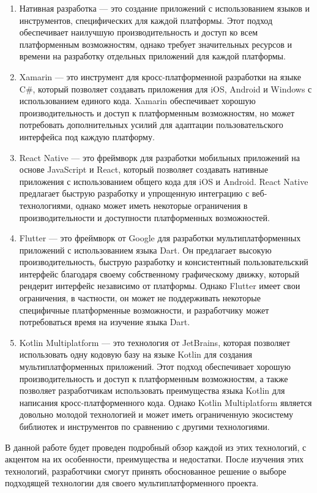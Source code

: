 \documentclass[14pt, russian]{scrartcl}
\begin{document}
\begin{enumerate}    
    \item Нативная разработка --- это создание приложений с использованием языков и инструментов, специфических для каждой платформы. Этот подход обеспечивает наилучшую производительность и доступ ко всем платформенным возможностям, однако требует значительных ресурсов и времени на разработку отдельных приложений для каждой платформы.
    \item Xamarin --- это инструмент для кросс-платформенной разработки на языке C\#, который позволяет создавать приложения для iOS, Android и Windows с использованием единого кода. Xamarin обеспечивает хорошую производительность и доступ к платформенным возможностям, но может потребовать дополнительных усилий для адаптации пользовательского интерфейса под каждую платформу.
    \item React Native --- это фреймворк для разработки мобильных приложений на основе JavaScript и React, который позволяет создавать нативные приложения с использованием общего кода для iOS и Android. React Native предлагает быструю разработку и упрощенную интеграцию с веб-технологиями, однако может иметь некоторые ограничения в производительности и доступности платформенных возможностей.
    \item Flutter --- это фреймворк от Google для разработки мультиплатформенных приложений с использованием языка Dart. Он предлагает высокую производительность, быструю разработку и консистентный пользовательский интерфейс благодаря своему собственному графическому движку, который рендерит интерфейс независимо от платформы. Однако Flutter имеет свои ограничения, в частности, он может не поддерживать некоторые специфичные платформенные возможности, и разработчику может потребоваться время на изучение языка Dart.
    \item Kotlin Multiplatform --- это технология от JetBrains, которая позволяет использовать одну кодовую базу на языке Kotlin для создания мультиплатформенных приложений. Этот подход обеспечивает хорошую производительность и доступ к платформенным возможностям, а также позволяет разработчикам использовать преимущества языка Kotlin для написания кросс-платформенного кода. Однако Kotlin Multiplatform является довольно молодой технологией и может иметь ограниченную экосистему библиотек и инструментов по сравнению с другими технологиями.
\end{enumerate}

В данной работе будет проведен подробный обзор каждой из этих технологий, с акцентом на их особенности, преимущества и недостатки. После изучения этих технологий, разработчики смогут принять обоснованное решение о выборе подходящей технологии для своего мультиплатформенного проекта.
\end{document}
